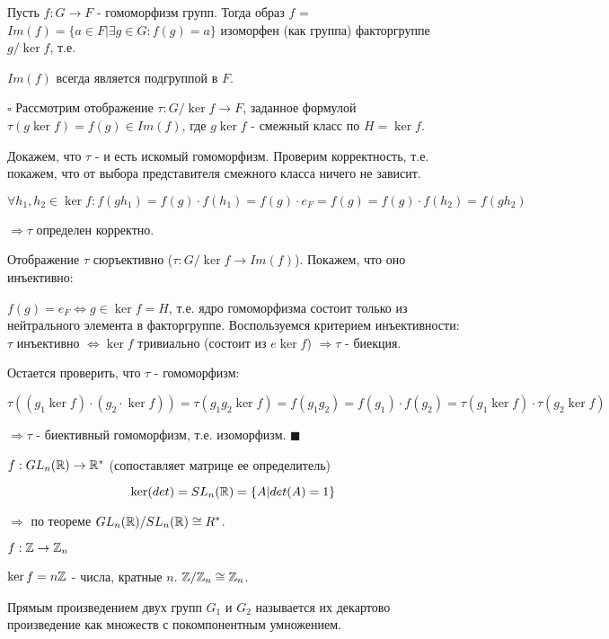 \documentclass[../main.tex]{subfiles}
\begin{document}
\void
{}

Пусть $f: G\rightarrow F$ - гомоморфизм групп. Тогда образ $f$ = $Im(f) = \{ a\in F\vert \exists g\in G: f(g) = a\}$
изоморфен (как группа) факторгруппе $g/\ker{f}$, т.е.

\void{} $Im(f)$ всегда является подгруппой в $F$.

\void
$\square$ Рассмотрим отображение $\tau: G/\ker{f}\rightarrow F$, заданное формулой
$\tau(g\ker{f}) = f(g)\in Im(f)$, где $g\ker{f}$ - смежный класс по $H = \ker{f}$.

Докажем, что $\tau$ - и есть искомый гомоморфизм. Проверим корректность, т.е. покажем,
что от выбора представителя смежного класса ничего не зависит.

$$\forall h_1,h_2\in \ker{f}: f(gh_1) = f(g)\cdot f(h_1) = f(g)\cdot e_F = f(g) = 
f(g)\cdot f(h_2) = f(gh_2)$$

$\Rightarrow \tau$ определен корректно.

Отображение $\tau$ сюръективно ($\tau: G/\ker{f}\rightarrow Im(f)$). Покажем,
что оно инъективно:

$f(g) = e_F \Longleftrightarrow g\in \ker{f} = H$, т.е. ядро гомоморфизма состоит только из
нейтрального элемента в факторгруппе. Воспользуемся критерием инъективности: $\tau$
инъективно $\Longleftrightarrow \ker{f}$ тривиально (состоит из $e\ker{f}$) $\Longrightarrow \tau$
- биекция.

Остается проверить, что $\tau$ - гомоморфизм:

$$\tau((g_1\ker{f})\cdot (g_2\cdot\ker{f})) = \tau(g_1g_2\ker{f}) = f(g_1g_2) = f(g_1)\cdot f(g_2)
= \tau(g_1\ker{f})\cdot \tau(g_2\ker{f})$$

$\Longrightarrow \tau$ - биективный гомоморфизм, т.е. изоморфизм. $\blacksquare$

\void
{}

\void{} $f: GL_n(\mathbb{R}) \rightarrow \mathbb{R}^*$ (сопоставляет матрице ее определитель)

$$\ker(det) = SL_n(\mathbb{R}) = \{A\vert det(A) = 1\}$$

$\Rightarrow$ по теореме $GL_n(\mathbb{R})/SL_n(\mathbb{R}) \cong R^*$.

\void{} $f: \mathbb{Z} \rightarrow \mathbb{Z}_n$

$\ker{f} = n\mathbb{Z}$ - числа, кратные $n$. $\mathbb{Z}/\mathbb{Z}_n \cong \mathbb{Z}_n$.

\void
{} Прямым произведением двух групп $G_1$ и $G_2$ называется их декартово
произведение как множеств с покомпонентным умножением.
\end{document}
